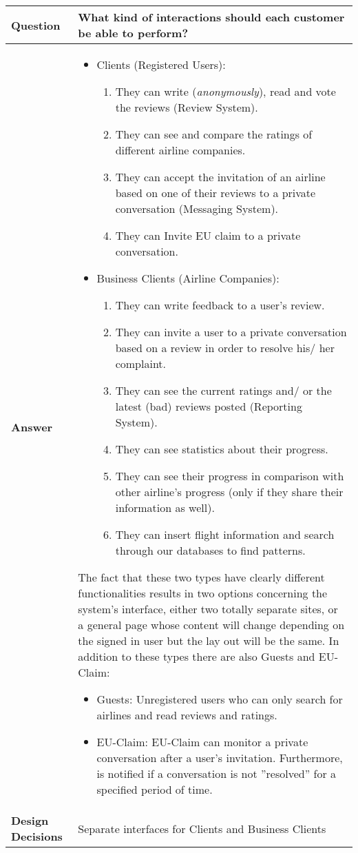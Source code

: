 \clearpage
\begin{longtable}{| l |  p{12cm} |}
\hline
\textbf{Question} & \textbf{What kind of interactions should each customer be able to perform?} \\ \hline
\textbf{Answer} &\begin{itemize}
\item Clients (Registered Users):
	\begin{enumerate}
		\item They can write ({\em anonymously}), read and vote the reviews (Review System).
       		 \item They can see and compare the ratings of different airline companies.
        	\item They can accept the invitation of an airline based on one of their reviews to a private conversation (Messaging System). 
		\item They can Invite EU claim to a private conversation.
	\end{enumerate}
\item Business Clients (Airline Companies):
	\begin{enumerate}
		\item They can write feedback to a user's review.
		\item They can invite a user to a private conversation based on a review in order to resolve his/ her complaint.
		\item They can see the current ratings and/ or the latest (bad) reviews posted (Reporting System).
		\item They can see statistics about their progress.
		\item They can see their progress in comparison with other airline's progress (only if they share their information as well).
		\item They can insert flight information and search through our databases to find patterns.
	\end{enumerate}
\end{itemize} 
The fact that these two types have clearly different functionalities results in two options concerning the system's interface, either two totally separate sites, or a general page whose content will change depending on the signed in user but the lay out will be the same.
In addition to these types there are also Guests and EU-Claim:
	\begin{itemize}
 	\item Guests: Unregistered users who can only search for airlines and read reviews and ratings.
 	\item EU-Claim: EU-Claim can monitor a private conversation after a user's invitation. Furthermore, is notified if a conversation is not ''resolved'' for a specified period of time.
	\end{itemize}
\\ \hline
\textbf{Design Decisions} & Separate interfaces for Clients and Business Clients \\ \hline
\end{longtable}



